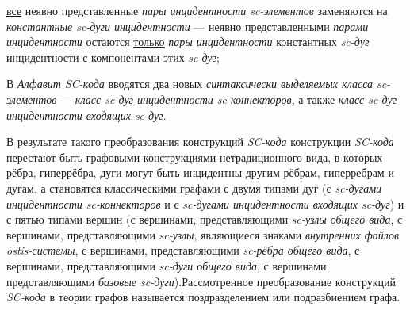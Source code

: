 \begin{SCn}
\begin{scnsubstruct}
\begin{scneqtoset}
{                \begin{scnitemize}
                    \item \uline{все} неявно представленные \textit{пары инцидентности sc-элементов} заменяются на \textit{константные sc-дуги инцидентности} --- неявно представленными \textit{парами инцидентности} остаются \uline{только} \textit{пары инцидентности} константных \textit{sc-дуг} инцидентности с компонентами этих \textit{sc-дуг};
                    \item В \textit{Алфавит SC-кода} вводятся два новых \textit{синтаксически выделяемых класса sc-элементов} --- \textit{класс sc-дуг инцидентности sc-коннекторов}, а также \textit{класс sc-дуг инцидентности входящих sc-дуг}.
                \end{scnitemize}
                В результате такого преобразования конструкций \textit{SC-кода} конструкции \textit{SC-кода} перестают быть графовыми конструкциями нетрадиционного вида, в которых рёбра, гиперрёбра, дуги могут быть инцидентны другим рёбрам, гиперребрам и дугам, а становятся классическими графами с двумя типами дуг (с \textit{sc-дугами инцидентности sc-коннекторов} и с \textit{sc-дугами инцидентности входящих sc-дуг}) и с пятью типами вершин (с вершинами, представляющими \textit{sc-узлы общего вида}, с вершинами, представляющими \textit{sc-узлы}, являющиеся знаками \textit{внутренних файлов ostis-системы}, с вершинами, представляющими \textit{sc-рёбра общего вида}, с вершинами, представляющими \textit{sc-дуги общего вида}, с вершинами, представляющими \textit{базовые sc-дуги}).Рассмотренное преобразование конструкций \textit{SC-кода} в теории графов называется поздразделением или подразбиением графа.}
                \begin{scnindent}
                \end{scnindent}
            \end{scneqtoset}
            \scnendsegmentcomment
            \bigskip
        \end{scnsubstruct}
    \scnendcurrentsectioncomment
    
    \end{SCn}
    \label{sd_sc_code_syntax}
    \label{sd_sc_code_semantic}